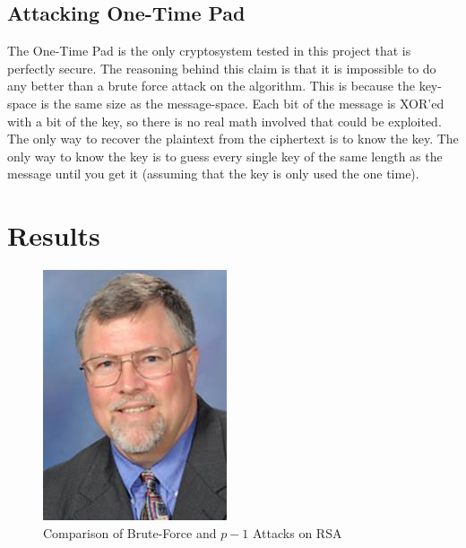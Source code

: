 \documentclass[12pt]{report}
\begin{document}
\subsection{Attacking One-Time Pad}
The One-Time Pad is the only cryptosystem tested in this project that is perfectly secure. The reasoning behind this claim is that it is impossible to do any better than a brute force attack on the algorithm. This is because the key-space is the same size as the message-space. Each bit of the message is XOR'ed with a bit of the key, so there is no real math involved that could be exploited. The only way to recover the plaintext from the ciphertext is to know the key. The only way to know the key is to guess every single key of the same length as the message until you get it (assuming that the key is only used the one time).

\section{Results}
\label{results}

\begin{figure}[hp!] %
    \begin{center}
        \includegraphics[width=0.5\linewidth]{walker.jpg}
        \caption{Comparison of Brute-Force and $p-1$ Attacks on RSA}
        \label{fig:rsa}
    \end{center}
\end{figure}
\end{document}
